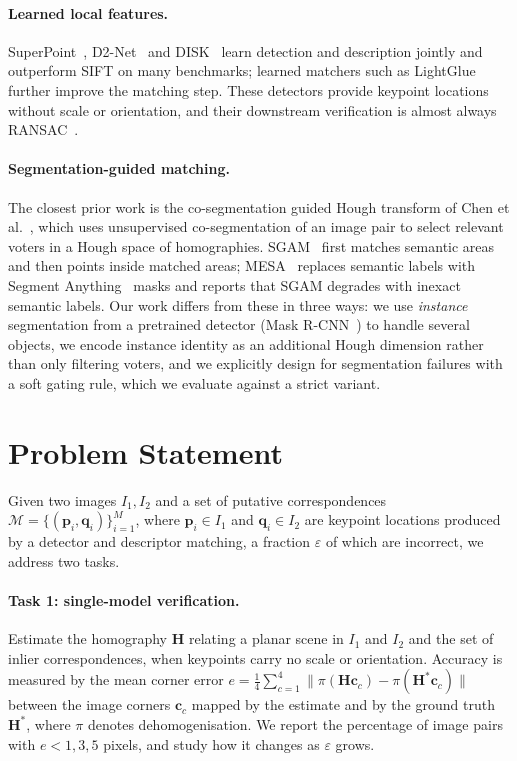 \documentclass{article}
\begin{document}
\paragraph{Learned local features.}
SuperPoint~\cite{detone2018superpoint}, D2-Net~\cite{dusmanu2019d2net} and
DISK~\cite{tyszkiewicz2020disk} learn detection and description jointly and
outperform SIFT on many benchmarks; learned matchers such as
LightGlue~\cite{lindenberger2023lightglue} further improve the matching step.
These detectors provide keypoint locations without scale or orientation, and
their downstream verification is almost always RANSAC~\cite{yu2024gvbench}.

\paragraph{Segmentation-guided matching.}
The closest prior work is the co-segmentation guided Hough transform of Chen
et al.~\cite{chen2015coseghough}, which uses unsupervised co-segmentation of
an image pair to select relevant voters in a Hough space of homographies.
SGAM~\cite{zhang2023sgam} first matches semantic areas and then points inside
matched areas; MESA~\cite{zhang2024mesa} replaces semantic labels with Segment
Anything~\cite{kirillov2023sam} masks and reports that SGAM degrades with
inexact semantic labels. Our work differs from these in three ways: we use
\emph{instance} segmentation from a pretrained detector (Mask
R-CNN~\cite{he2017maskrcnn}) to handle several objects, we encode instance
identity as an additional Hough dimension rather than only filtering voters,
and we explicitly design for segmentation failures with a soft gating rule,
which we evaluate against a strict variant.

\section{Problem Statement}

Given two images $I_1, I_2$ and a set of putative correspondences
$\mathcal{M} = \{(\mathbf{p}_i, \mathbf{q}_i)\}_{i=1}^{M}$, where
$\mathbf{p}_i \in I_1$ and $\mathbf{q}_i \in I_2$ are keypoint locations
produced by a detector and descriptor matching, a fraction $\varepsilon$ of
which are incorrect, we address two tasks.

\paragraph{Task 1: single-model verification.} Estimate the homography
$\mathbf{H}$ relating a planar scene in $I_1$ and $I_2$ and the set of inlier
correspondences, when keypoints carry no scale or orientation. Accuracy is
measured by the mean corner error
$e = \tfrac14 \sum_{c=1}^{4} \lVert \pi(\mathbf{H}\mathbf{c}_c) -
\pi(\mathbf{H}^{\ast}\mathbf{c}_c)\rVert$ between the image corners
$\mathbf{c}_c$ mapped by the estimate and by the ground truth
$\mathbf{H}^{\ast}$, where $\pi$ denotes dehomogenisation. We report the
percentage of image pairs with $e < 1, 3, 5$ pixels, and study how it changes
as $\varepsilon$ grows.
\end{document}
